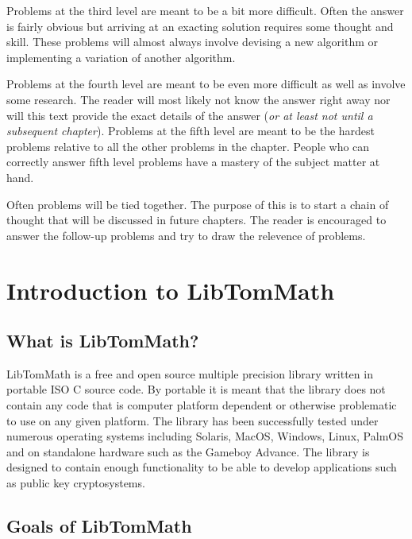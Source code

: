 \documentclass[b5paper]{book}
\begin{document}
Problems at the third level are meant to be a bit more difficult.  Often the answer is fairly obvious but arriving at an exacting solution
requires some thought and skill.  These problems will almost always involve devising a new algorithm or implementing a variation of
another algorithm.

Problems at the fourth level are meant to be even more difficult as well as involve some research.  The reader will most likely not know
the answer right away nor will this text provide the exact details of the answer (\textit{or at least not until a subsequent chapter}).  Problems
at the fifth level are meant to be the hardest problems relative to all the other problems in the chapter.  People who can correctly 
answer fifth level problems have a mastery of the subject matter at hand.

Often problems will be tied together.  The purpose of this is to start a chain of thought that will be discussed in future chapters.  The reader
is encouraged to answer the follow-up problems and try to draw the relevence of problems.

\chapter{Introduction to LibTomMath}

\section{What is LibTomMath?}
LibTomMath is a free and open source multiple precision library written in portable ISO C source code.  By portable it is 
meant that the library does not contain any code that is computer platform dependent or otherwise problematic to use on any 
given platform.  The library has been successfully tested under numerous operating systems including Solaris, MacOS, Windows, 
Linux, PalmOS and on standalone hardware such as the Gameboy Advance.  The library is designed to contain enough 
functionality to be able to develop applications such as public key cryptosystems.

\section{Goals of LibTomMath}
\end{document}
